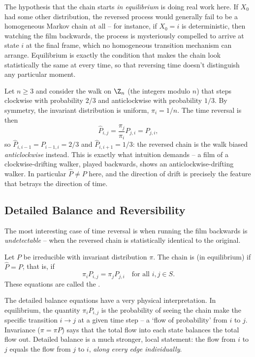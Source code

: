 \documentclass[a4paper]{scrartcl}
\begin{document}
\begin{remark}
	The hypothesis that the chain starts \emph{in equilibrium} is doing real work here. If $X_0$ had some other distribution, the reversed process would generally fail to be a homogeneous Markov chain at all -- for instance, if $X_0 = i$ is deterministic, then watching the film backwards, the process is mysteriously compelled to arrive at state $i$ at the final frame, which no homogeneous transition mechanism can arrange. Equilibrium is exactly the condition that makes the chain look statistically the same at every time, so that reversing time doesn't distinguish any particular moment.
\end{remark}

\begin{example}
	Let $n \geq 3$ and consider the walk on $\Z_n$ (the integers modulo $n$) that steps clockwise with probability $2/3$ and anticlockwise with probability $1/3$. By symmetry, the invariant distribution is uniform, $\pi_i = 1/n$. The time reversal is then
	$$
	\widehat{P}_{i, j} = \frac{\pi_j}{\pi_i}P_{j, i} = P_{j, i},
	$$
	so $\widehat{P}_{i, i - 1} = P_{i - 1, i} = 2/3$ and $\widehat{P}_{i, i + 1} = 1/3$: the reversed chain is the walk biased \emph{anticlockwise} instead. This is exactly what intuition demands -- a film of a clockwise-drifting walker, played backwards, shows an anticlockwise-drifting walker. In particular $\widehat{P} \neq P$ here, and the direction of drift is precisely the feature that betrays the direction of time.
\end{example}

\subsection{Detailed Balance and Reversibility}

The most interesting case of time reversal is when running the film backwards is \emph{undetectable} -- when the reversed chain is statistically identical to the original.

\begin{definition}[Reversibility]
	Let $P$ be irreducible with invariant distribution $\pi$. The chain is  (in equilibrium) if $\widehat{P} = P$, that is, if
	$$
	\pi_i P_{i, j} = \pi_j P_{j, i} \quad \text{for all } i, j \in S.
	$$
	These equations are called the .
\end{definition}

The detailed balance equations have a very physical interpretation. In equilibrium, the quantity $\pi_i P_{i, j}$ is the probability of seeing the chain make the specific transition $i \rightarrow j$ at a given time step -- a `flow of probability' from $i$ to $j$. Invariance ($\pi = \pi P$) says that the total flow into each state balances the total flow out. Detailed balance is a much stronger, local statement: the flow from $i$ to $j$ equals the flow from $j$ to $i$, \emph{along every edge individually}.
\end{document}
